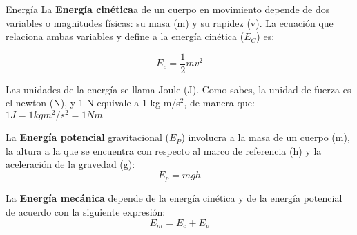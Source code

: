 \begin{infocard}{Energía}
    La   \textbf{Energía cinética}a de un cuerpo en movimiento depende de
    dos variables o magnitudes f\'isicas: su masa (m) y su rapidez (v). La ecuaci\'on
    que relaciona ambas variables y define a la energ\'ia cin\'etica ($E_C$) es:

    \[E_c=\frac{1}{2}mv^2 \]

    Las unidades de la energía se llama Joule (J). Como sabes, la unidad de fuerza es el
    newton (N), y 1 N equivale a 1 kg m/s$^2$, de manera que: $1 J = 1 kg m^2/s^2 = 1 Nm $
    \tcblower

    La \textbf{Energía potencial} gravitacional ($E_P$) involucra
    a la masa de un cuerpo (m), la altura a la que se encuentra con respecto al
    marco de referencia (h) y la aceleraci\'on de la gravedad (g):
    \[E_p=mgh\]
    \DrawLine

    La \textbf{Energía mecánica} depende de la energ\'ia
    cin\'etica y de la energ\'ia potencial de acuerdo con la siguiente expresi\'on:
    \begin{equation*}
        E_m=E_c+E_p
    \end{equation*}
\end{infocard}